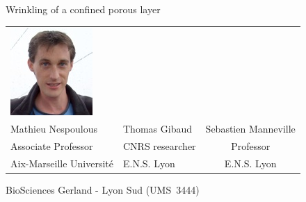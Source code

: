 \begin{frame}{Wrinkling of a confined porous layer}
\begin{tabu}{X[c]X[c]c}
\includegraphics[height=0.3\textheight]{Seb}\\
Mathieu Nespoulous & Thomas Gibaud & Sebastien Manneville\\
Associate Professor & CNRS researcher & Professor\\
Aix-Marseille Universit\'{e} & E.N.S. Lyon & E.N.S. Lyon\\
\end{tabu}

\bigskip
{} BioSciences Gerland - Lyon Sud (UMS~3444)
\end{frame}


